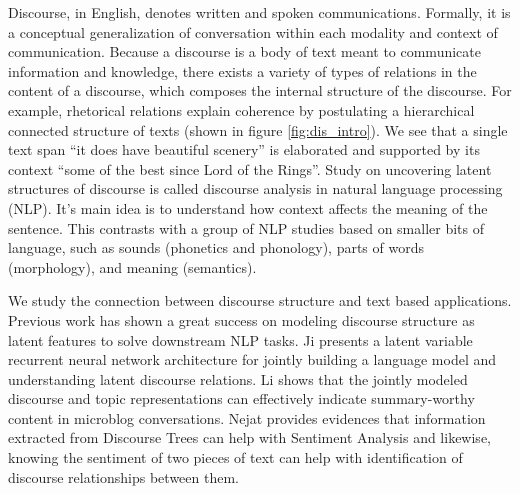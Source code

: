 Discourse, in English, denotes written and spoken communications. Formally, it is a conceptual generalization of conversation within each modality and context of communication.  Because a discourse is a body of text meant to communicate information and knowledge, there exists a variety of types of relations in the content of a discourse, which composes the internal structure of the discourse. For example, rhetorical relations explain coherence by postulating a hierarchical connected structure of texts (shown in figure \ref{fig:dis_intro}). We see that a single text span ``it does have beautiful scenery'' is elaborated and supported by its context ``some of the best since Lord of the Rings''. Study on uncovering latent structures of discourse is called discourse analysis in natural language processing (NLP). It's main idea is to understand how context affects the meaning of the sentence. This contrasts with a group of NLP studies based on smaller bits of language, such as sounds (phonetics and phonology), parts of words (morphology), and meaning (semantics).  %

 
We study the connection between discourse structure and text based applications. Previous work has shown a great success on modeling discourse structure as latent features to solve downstream NLP tasks. Ji \cite{ji2016latent2} presents a latent variable recurrent neural network architecture for jointly building a language model and understanding latent discourse relations. Li \cite{li2018joint} shows that the jointly modeled discourse and topic representations can effectively indicate summary-worthy content in microblog conversations. Nejat \cite{nejat2017exploring} provides evidences that information extracted from Discourse Trees can help with Sentiment Analysis and likewise, knowing the sentiment of two pieces of text can help with identification of discourse relationships between them.  

